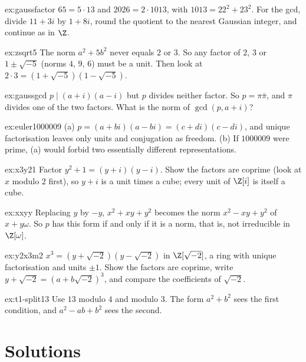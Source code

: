 \begin{hint}{ex:gaussfactor}
$65=5\cdot13$ and $2026=2\cdot1013$, with $1013=22^2+23^2$. For the gcd, divide $11+3i$ by $1+8i$, round the quotient to the nearest Gaussian integer, and continue as in $\Z$.
\end{hint}
\begin{hint}{ex:zsqrt5}
The norm $a^2+5b^2$ never equals $2$ or $3$. So any factor of $2$, $3$ or $1\pm\sqrt{-5}$ (norms $4$, $9$, $6$) must be a unit. Then look at $2\cdot3=(1+\sqrt{-5})(1-\sqrt{-5})$.
\end{hint}
\begin{hint}{ex:gaussgcd}
$p\mid(a+i)(a-i)$ but $p$ divides neither factor. So $p=\pi\bar\pi$, and $\pi$ divides one of the two factors. What is the norm of $\gcd(p,a+i)$?
\end{hint}
\begin{hint}{ex:euler1000009}
(a) $p=(a+bi)(a-bi)=(c+di)(c-di)$, and unique factorisation leaves only units and conjugation as freedom. (b) If $1000009$ were prime, (a) would forbid two essentially different representations.
\end{hint}
\begin{hint}{ex:x3y21}
Factor $y^2+1=(y+i)(y-i)$. Show the factors are coprime (look at $x$ modulo $2$ first), so $y+i$ is a unit times a cube; every unit of $\Z[i]$ is itself a cube.
\end{hint}
\begin{hint}{ex:xxyy}
Replacing $y$ by $-y$, $x^2+xy+y^2$ becomes the norm $x^2-xy+y^2$ of $x+y\omega$. So $p$ has this form if and only if it is a norm, that is, not irreducible in $\Z[\omega]$.
\end{hint}
\begin{hint}{ex:y2x3m2}
$x^3=(y+\sqrt{-2})(y-\sqrt{-2})$ in $\Z[\sqrt{-2}]$, a ring with unique factorisation and units $\pm1$. Show the factors are coprime, write $y+\sqrt{-2}=(a+b\sqrt{-2})^3$, and compare the coefficients of $\sqrt{-2}$.
\end{hint}

\begin{hint}{ex:t1-split13}
Use $13$ modulo $4$ and modulo $3$. The form $a^2+b^2$ sees the first condition, and $a^2-ab+b^2$ sees the second.
\end{hint}

\section{Solutions}

